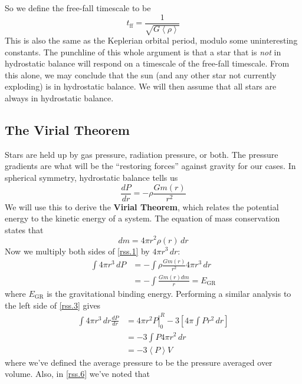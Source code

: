 \documentclass[10pt]{article}
\numberwithin{equation}{section}
\newcommand{\avg}[1]{\left\langle#1\right\rangle}
\begin{document}
	So we define the free-fall timescale to be
	\begin{equation}
		\label{mc.7} t_{\mathrm{ff}}=\frac{1}{\sqrt{G\avg{\rho}}}
	\end{equation}
	This is also the same as the Keplerian orbital period, modulo some 
uninteresting constants. The punchline of this whole argument is that a 
star that is \emph{not} in hydrostatic balance will respond on a timescale 
of the free-fall timescale. From this alone, we may conclude that the sun 
(and any other star not currently exploding) is in hydrostatic balance. We 
will then assume that all stars are always in hydrostatic balance.\\
	
	\subsection{The Virial Theorem}
	Stars are held up by gas pressure, radiation pressure, or both. The 
pressure gradients are what will be the ``restoring forces'' against 
gravity for our cases. In spherical symmetry, hydrostatic balance tells us
	\begin{equation}
		\label{rss.1} \frac{dP}{dr}=-\rho\frac{Gm(r)}{r^2}
	\end{equation}
	We will use this to derive the \textbf{Virial Theorem}, which relates 
the potential energy to the kinetic energy of a system. The equation of 
mass conservation states that
	\begin{equation}
		\label{rss.2} dm=4\pi r^2\rho(r)\,dr
	\end{equation}
	Now we multiply both sides of \eqref{rss.1} by $4\pi r^3\,dr$:
	\begin{align}
		\label{rss.3} \int 4\pi r^3\,dP&=-\int \rho\frac{Gm(r)}{r^2}4\pi 
r^3\,dr\\
		\label{rss.4} &= -\int\frac{Gm(r)dm}{r} = E_{\mathrm{GR}}
	\end{align}
	where $E_{\mathrm{GR}}$ is the gravitational binding energy. Performing 
a similar analysis to the left side of \eqref{rss.3} gives
	\begin{align}
		\label{rss.5} \int 4\pi r^3\,dr\frac{dP}{dr} &= \left.4\pi r^2P
\right|_{0}^R-3\left[4\pi\int Pr^2\,dr\right]\\
		\label{rss.6} &= -3\int P4\pi  r^2\,dr\\
		\label{rss.7}&=-3\avg{P}V
	\end{align}
	where we've defined the average pressure to be the pressure
        averaged over volume. Also, in \eqref{rss.6} we've noted that
\end{document}
